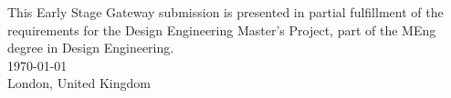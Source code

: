 \begin{titlepage}
\begin{center}
{\normalsize This Early Stage Gateway submission is presented in partial fulfillment of the}\\[0.2cm]
{\normalsize requirements for the Design Engineering Master’s Project, part of the MEng}\\[0.2cm]
{\normalsize degree in Design Engineering.}\\[1.0cm]

{\normalsize \today}\\[0.2cm]
{\normalsize London, United Kingdom}

\vfill

\end{center}
\end{titlepage}